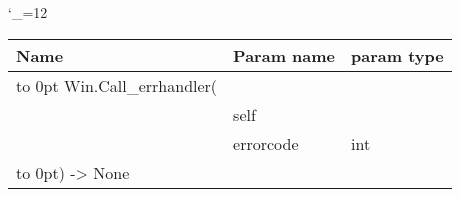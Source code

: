 \begingroup \catcode`\_=12 \tt
\begin{tabular}{lll}
\toprule
\textrm{Name}&\textrm{Param name}&\textrm{param type}\\
\midrule
\hbox to 0pt {Win.Call_errhandler(\hss}\\
& self\\
& errorcode & int\\
\hbox to 0pt{) -> None\hss}\\
\bottomrule
\end{tabular}
\endgroup
